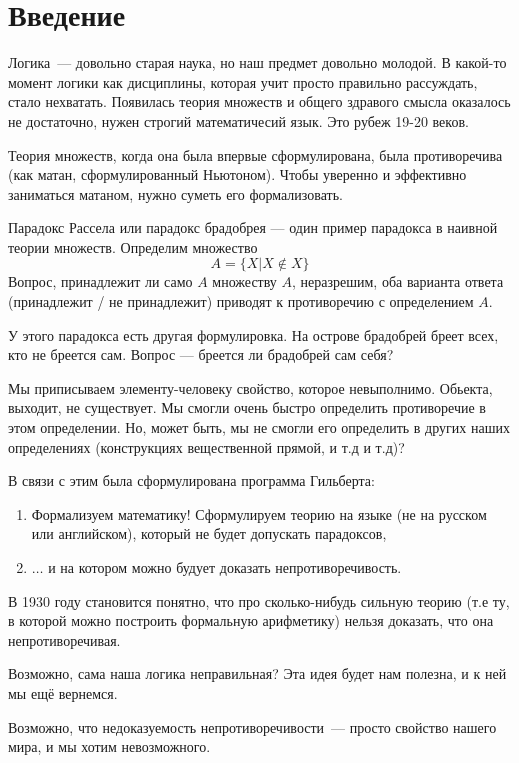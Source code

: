 \section{Введение}
Логика~--- довольно старая наука, но наш предмет довольно молодой.
В какой-то момент логики как дисциплины, которая учит просто правильно рассуждать, стало нехватать.
Появилась теория множеств и общего здравого смысла оказалось не достаточно, нужен строгий математичесий язык. 
Это рубеж 19-20 веков.

Теория множеств, когда она была впервые сформулирована, была противоречива (как матан, сформулированный Ньютоном).
Чтобы уверенно и эффективно заниматься матаном, нужно суметь его формализовать. 

Парадокс Рассела или парадокс брадобрея --- один пример парадокса в наивной теории множеств.
Определим множество 
\[ A = \{ X | X \notin X \}\]
Вопрос, принадлежит ли само $A$ множеству $A$, неразрешим, 
оба варианта ответа (принадлежит / не принадлежит) приводят к противоречию с определением $A$.

У этого парадокса есть другая формулировка. 
На острове брадобрей бреет всех, кто не бреется сам. 
Вопрос --- бреется ли брадобрей сам себя? 

Мы приписываем элементу-человеку свойство, которое невыполнимо.
Обьекта, выходит, не существует.
Мы смогли очень быстро определить противоречие в этом определении.
Но, может быть, мы не смогли его определить в других наших определениях
(конструкциях вещественной прямой, и т.д и т.д)?

В связи с этим была сформулирована программа Гильберта:
\begin{enumerate}
\item Формализуем математику!
Сформулируем теорию на языке (не на русском или английском), который не будет допускать парадоксов, 
\item $\ldots$ и на котором можно будует доказать непротиворечивость. 
\end{enumerate}
В 1930 году становится понятно, что про сколько-нибудь сильную теорию (т.е ту, в которой можно построить формальную арифметику) нельзя доказать, что она непротиворечивая.

Возможно, сама наша логика неправильная? 
Эта идея будет нам полезна, и к ней мы ещё вернемся.

Возможно, что недоказуемость непротиворечивости~--- просто свойство нашего мира, и мы хотим невозможного.

